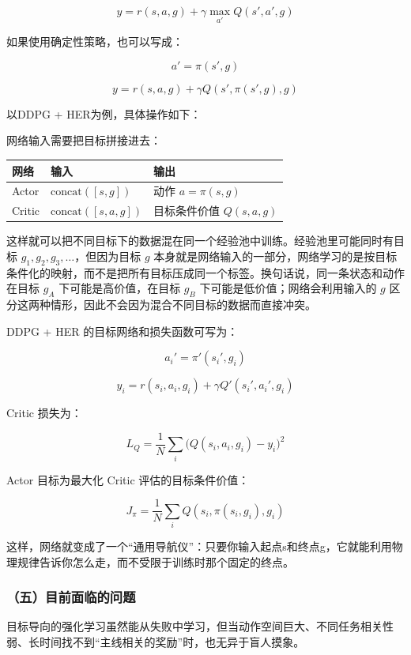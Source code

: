 \[
y
=
r(s,a,g)
+
\gamma
\max_{a'}Q(s',a',g)
\]

如果使用确定性策略，也可以写成：

\[
a'=\pi(s',g)
\]

\[
y
=
r(s,a,g)
+
\gamma Q(s',\pi(s',g),g)
\]

以DDPG + HER为例，具体操作如下：

网络输入需要把目标拼接进去：

\begin{longtable}[]{@{}lll@{}}
\toprule
网络 & 输入 & 输出 \\
\midrule
\endhead
Actor & \(\mathrm{concat}([s,g])\) & 动作 \(a=\pi(s,g)\) \\
Critic & \(\mathrm{concat}([s,a,g])\) & 目标条件价值 \(Q(s,a,g)\) \\
\bottomrule
\end{longtable}

这样就可以把不同目标下的数据混在同一个经验池中训练。经验池里可能同时有目标 \(g_1,g_2,g_3,\ldots\)，但因为目标 \(g\) 本身就是网络输入的一部分，网络学习的是按目标条件化的映射，而不是把所有目标压成同一个标签。换句话说，同一条状态和动作在目标 \(g_A\) 下可能是高价值，在目标 \(g_B\) 下可能是低价值；网络会利用输入的 \(g\) 区分这两种情形，因此不会因为混合不同目标的数据而直接冲突。

DDPG + HER 的目标网络和损失函数可写为：

\[
a_i'=\pi'(s_i',g_i)
\]

\[
y_i
=
r(s_i,a_i,g_i)
+
\gamma Q'(s_i',a_i',g_i)
\]

Critic 损失为：

\[
L_Q
=
\frac{1}{N}
\sum_i
\bigl(
Q(s_i,a_i,g_i)-y_i
\bigr)^{2}
\]

Actor 目标为最大化 Critic 评估的目标条件价值：

\[
J_\pi
=
\frac{1}{N}
\sum_i
Q(s_i,\pi(s_i,g_i),g_i)
\]

这样，网络就变成了一个``通用导航仪''：只要你输入起点s和终点g，它就能利用物理规律告诉你怎么走，而不受限于训练时那个固定的终点。

\hypertarget{ux4e94ux76eeux524dux9762ux4e34ux7684ux95eeux9898}{%
\subsubsection{（五）目前面临的问题}\label{ux4e94ux76eeux524dux9762ux4e34ux7684ux95eeux9898}}

目标导向的强化学习虽然能从失败中学习，但当动作空间巨大、不同任务相关性弱、长时间找不到``主线相关的奖励''时，也无异于盲人摸象。

